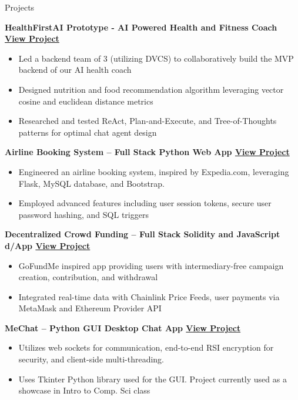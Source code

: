 \documentclass{cv} %
\begin{document}
\begin{rSection}{Projects}

	\textbf{HealthFirstAI Prototype - AI Powered Health and Fitness Coach \href{https://youtu.be/FFocBeiQ8dE}{View Project}}
	\begin{itemize}
		\item Led a backend team of 3 (utilizing DVCS) to collaboratively build the MVP backend of our AI health coach
		\item Designed nutrition and food recommendation algorithm leveraging vector cosine and euclidean distance metrics
		\item Researched and tested ReAct, Plan-and-Execute, and Tree-of-Thoughts patterns for optimal chat agent design
	\end{itemize}

	\textbf{Airline Booking System – Full Stack Python Web App \href{https://github.com/larry-lime/airline-ticket-system}{View Project}}
	\begin{itemize}
		\item Engineered an airline booking system, inspired by Expedia.com, leveraging Flask, MySQL database, and Bootstrap.
		\item Employed advanced features including user session tokens, secure user password hashing, and SQL triggers
	\end{itemize}

	\textbf{Decentralized Crowd Funding – Full Stack Solidity and JavaScript d/App \href{https://github.com/larry-lime/fund-me-backend}{View Project}}
	\begin{itemize}
		\item GoFundMe inspired app providing users with intermediary-free campaign creation, contribution, and withdrawal
		\item Integrated real-time data with Chainlink Price Feeds, user payments via MetaMask and Ethereum Provider API
	\end{itemize}

	\textbf{MeChat – Python GUI Desktop Chat App \href{https://github.com/larry-lime/MeChat}{View Project}}
	\begin{itemize}
		\item Utilizes web sockets for communication, end-to-end RSI encryption for security, and client-side multi-threading.
		\item Uses Tkinter Python library used for the GUI. Project currently used as a showcase in Intro to Comp. Sci class
	\end{itemize}

\end{rSection}
\end{document}
